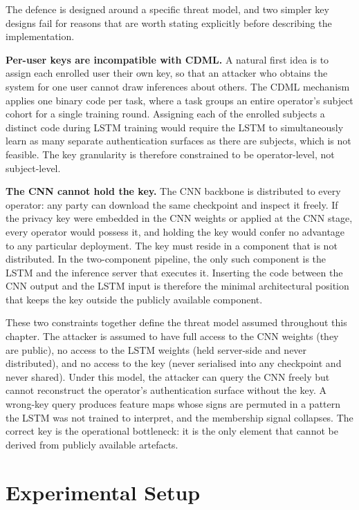 The defence is designed around a specific threat model, and two simpler key designs fail for reasons that are worth stating explicitly before describing the implementation.

\textbf{Per-user keys are incompatible with CDML.} A natural first idea is to assign each enrolled user their own key, so that an attacker who obtains the system for one user cannot draw inferences about others. The CDML mechanism applies one binary code per task, where a task groups an entire operator's subject cohort for a single training round. Assigning each of the enrolled subjects a distinct code during LSTM training would require the LSTM to simultaneously learn as many separate authentication surfaces as there are subjects, which is not feasible. The key granularity is therefore constrained to be operator-level, not subject-level.

\textbf{The CNN cannot hold the key.} The CNN backbone is distributed to every operator: any party can download the same checkpoint and inspect it freely. If the privacy key were embedded in the CNN weights or applied at the CNN stage, every operator would possess it, and holding the key would confer no advantage to any particular deployment. The key must reside in a component that is not distributed. In the two-component pipeline, the only such component is the LSTM and the inference server that executes it. Inserting the code between the CNN output and the LSTM input is therefore the minimal architectural position that keeps the key outside the publicly available component.

These two constraints together define the threat model assumed throughout this chapter. The attacker is assumed to have full access to the CNN weights (they are public), no access to the LSTM weights (held server-side and never distributed), and no access to the key (never serialised into any checkpoint and never shared). Under this model, the attacker can query the CNN freely but cannot reconstruct the operator's authentication surface without the key. A wrong-key query produces feature maps whose signs are permuted in a pattern the LSTM was not trained to interpret, and the membership signal collapses. The correct key is the operational bottleneck: it is the only element that cannot be derived from publicly available artefacts.

\section{Experimental Setup}
\label{sec:cl_setup}

